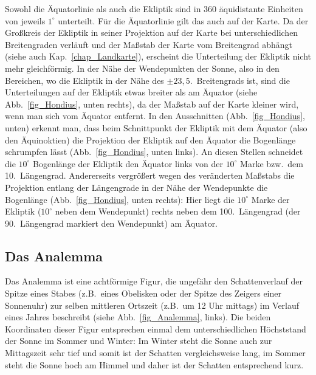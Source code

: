 Sowohl die \"Aquatorlinie als auch die Ekliptik sind in $360$ \"aquidistante Einheiten von
jeweils $1^\circ$ unterteilt. F\"ur die \"Aquatorlinie gilt das auch auf der Karte. Da der Gro\ss kreis
der Ekliptik in seiner Projektion auf der Karte bei unterschiedlichen Breitengraden verl\"auft und
der Ma\ss stab der Karte vom Breitengrad abh\"angt (siehe auch Kap.\ \ref{chap_Landkarte}),
erscheint die Unterteilung der Ekliptik nicht mehr gleichf\"ormig.
In der N\"ahe der Wendepunkten der Sonne, also in den Bereichen, wo die
Ekliptik in der N\"ahe des $\pm 23,5$.\ Breitengrads ist, sind die Unterteilungen auf der Ekliptik etwas
breiter als am \"Aquator (siehe Abb.\ \ref{fig_Hondius}, unten rechts), da der Ma\ss stab auf der Karte kleiner
wird, wenn man sich vom \"Aquator entfernt. In den Ausschnitten (Abb.\ \ref{fig_Hondius}, unten)
erkennt man, dass beim Schnittpunkt der Ekliptik mit dem \"Aquator (also den \"Aquinoktien) die
Projektion der Ekliptik auf den \"Aquator die Bogenl\"ange schrumpfen l\"asst (Abb.\ \ref{fig_Hondius}, unten links).
An diesen Stellen schneidet die $10^\circ$ Bogenl\"ange der Ekliptik den \"Aquator links von der
$10^\circ$ Marke bzw.\ dem 10.\ L\"angengrad. Andererseits vergr\"o\ss ert
wegen des ver\"anderten Ma\ss stabs die Projektion entlang der L\"angengrade in der
N\"ahe der Wendepunkte die Bogenl\"ange (Abb.\ \ref{fig_Hondius}, unten rechts): Hier liegt die
$10^\circ$ Marke der Ekliptik ($10^\circ$ neben dem Wendepunkt) rechts neben dem 100.\ L\"angengrad
(der 90.\ L\"angengrad markiert den Wendepunkt) am \"Aquator. 

\subsection{Das Analemma}
\label{sec_Analemma}

Das Analemma 
ist eine achtf\"ormige Figur, die ungef\"ahr den Schattenverlauf der Spitze
eines Stabes (z.B.\ eines Obelisken oder der Spitze des Zeigers einer Sonnenuhr) zur
selben mittleren Ortszeit (z.B.\ um 12 Uhr mittags) im Verlauf eines Jahres beschreibt (siehe
Abb.\ \ref{fig_Analemma}, links). 
Die beiden Koordinaten dieser Figur entsprechen einmal dem unterschiedlichen H\"ochststand
der Sonne im Sommer und Winter: Im Winter steht die Sonne auch zur Mittagszeit sehr tief
und somit ist der Schatten vergleichsweise lang, im Sommer steht die Sonne hoch am
Himmel und daher ist der Schatten entsprechend kurz. 

